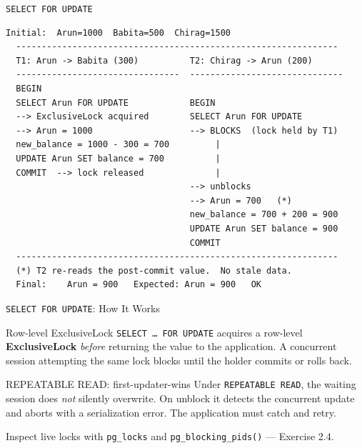 \documentclass[aspectratio=169,10pt]{beamer}
\begin{document}
\begin{frame}[fragile]{\texttt{SELECT FOR UPDATE}}

\begin{lstlisting}[style=ascii]
  Initial:  Arun=1000  Babita=500  Chirag=1500
  ---------------------------------------------------------------
  T1: Arun -> Babita (300)          T2: Chirag -> Arun (200)
  --------------------------------  ------------------------------
  BEGIN
  SELECT Arun FOR UPDATE            BEGIN
  --> ExclusiveLock acquired        SELECT Arun FOR UPDATE
  --> Arun = 1000                   --> BLOCKS  (lock held by T1)
  new_balance = 1000 - 300 = 700         |
  UPDATE Arun SET balance = 700          |
  COMMIT  --> lock released              |
                                    --> unblocks
                                    --> Arun = 700   (*)
                                    new_balance = 700 + 200 = 900
                                    UPDATE Arun SET balance = 900
                                    COMMIT
  ---------------------------------------------------------------
  (*) T2 re-reads the post-commit value.  No stale data.
  Final:    Arun = 900   Expected: Arun = 900   OK
\end{lstlisting}

\end{frame}

\begin{frame}{\texttt{SELECT FOR UPDATE}: How It Works}

  \begin{block}{Row-level ExclusiveLock}
    \texttt{SELECT \ldots\ FOR UPDATE} acquires a row-level
    \textbf{ExclusiveLock} \emph{before} returning the value to the
    application.  A concurrent session attempting the same lock
    blocks until the holder commits or rolls back.
  \end{block}

  \vspace{0.6em}

  \begin{block}{REPEATABLE READ: first-updater-wins}
    Under \texttt{REPEATABLE READ}, the waiting session does
    \emph{not} silently overwrite.  On unblock it detects the
    concurrent update and aborts with a serialization error.
    The application must catch and retry.
  \end{block}

  \vspace{0.4em}
  {\small Inspect live locks with \texttt{pg\_locks} and
  \texttt{pg\_blocking\_pids()} --- Exercise 2.4.}

\end{frame}
\end{document}
